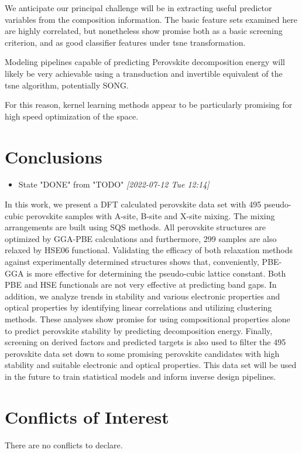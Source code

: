 \documentclass[twoside, twocolumn, 9pt, draft]{article}
\begin{document}
We anticipate our principal challenge will be in extracting useful
predictor variables from the composition information. The basic
feature sets examined here are highly correlated, but nonetheless show
promise both as a basic screening criterion, and as good classifier
features under \gls{tsne} transformation.

Modeling pipelines capable of predicting Perovskite decomposition
energy will likely be very achievable using a transduction and
invertible equivalent of the \gls{tsne} algorithm,
potentially SONG.

For this reason, kernel learning methods appear to be particularly
promising for high speed optimization of the space.

\section*{Conclusions}
\label{sec:orgdcad055}
\begin{itemize}
\item State "DONE"       from "TODO"       \textit{[2022-07-12 Tue 12:14]}
\end{itemize}
In this work, we present a DFT calculated perovskite data set with 495
pseudo-cubic perovskite samples with A-site, B-site and X-site
mixing. The mixing arrangements are built using SQS methods. All
perovskite structures are optimized by GGA-PBE calculations and
furthermore, 299 samples are also relaxed by HSE06
functional. Validating the efficacy of both relaxation methods against
experimentally determined structures shows that, conveniently, PBE-GGA
is more effective for determining the pseudo-cubic lattice
constant. Both PBE and HSE functionals are not very effective at
predicting band gaps. In addition, we analyze trends in stability and
various electronic properties and optical properties by identifying
linear correlations and utilizing clustering methods. These analyses
show promise for using compositional properties alone to predict
perovskite stability by predicting decomposition energy. Finally,
screening on derived factors and predicted targets is also used to
filter the 495 perovskite data set down to some promising perovskite
candidates with high stability and suitable electronic and optical
properties. This data set will be used in the future to train
statistical models and inform inverse design pipelines.

\section*{Conflicts of Interest}
\label{sec:orgdfbee76}
There are no conflicts to declare.
\end{document}
